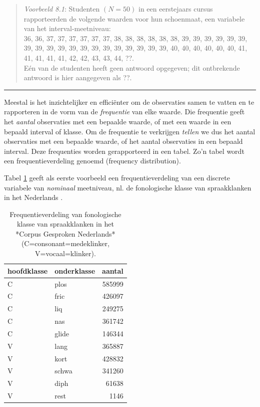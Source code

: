\documentclass[
]{book}
\begin{document}
\begin{quote}
\emph{Voorbeeld 8.1}: Studenten \((N=50)\) in een eerstejaars
cursus rapporteerden de volgende waarden voor hun schoenmaat, een
variabele van het interval-meetniveau:\\
36, 36, 37, 37, 37, 37, 37, 37, 38, 38, 38, 38, 38, 38, 39, 39, 39, 39,
39, 39, 39, 39, 39, 39, 39, 39, 39, 39, 39, 39, 39, 39, 39, 40, 40, 40,
40, 40, 40, 41, 41, 41, 41, 41, 42, 42, 43, 43, 44, ??.\\
Eén van de studenten heeft geen antwoord opgegeven; dit ontbrekende
antwoord is hier aangegeven als ??.
\end{quote}

\begin{center}\rule{0.5\linewidth}{0.5pt}\end{center}

Meestal is het inzichtelijker en efficiënter om de observaties samen te
vatten en te rapporteren in de vorm van de \emph{frequentie} van elke waarde.
Die frequentie geeft het \emph{aantal} observaties met een bepaalde waarde,
of met een waarde in een bepaald interval of klasse. Om de frequentie te
verkrijgen \emph{tellen} we dus het aantal observaties met een bepaalde
waarde, of het aantal observaties in een bepaald interval. Deze
frequenties worden gerapporteerd in een tabel. Zo'n tabel wordt een
frequentieverdeling genoemd (frequency distribution).

Tabel \ref{tab:klankfreq} geeft als eerste voorbeeld een
frequentieverdeling van een discrete variabele van \emph{nominaal}
meetniveau, nl. de fonologische klasse van spraakklanken in het
Nederlands \citep{LKCG07}.

\begin{table}[t]

\caption{\label{tab:klankfreq}Frequentieverdeling 
              van fonologische klasse van spraakklanken 
              in het *Corpus Gesproken Nederlands* 
              (C=consonant=medeklinker, V=vocaal=klinker).}
\centering
\begin{tabular}{llr}
\toprule
hoofdklasse & onderklasse & aantal\\
\midrule
C & plos & 585999\\
C & fric & 426097\\
C & liq & 249275\\
C & nas & 361742\\
C & glide & 146344\\
\addlinespace
V & lang & 365887\\
V & kort & 428832\\
V & schwa & 341260\\
V & diph & 61638\\
V & rest & 1146\\
\bottomrule
\end{tabular}
\end{table}
\end{document}
